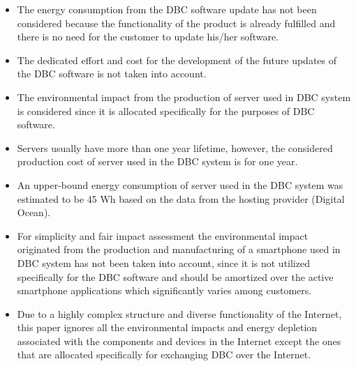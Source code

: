 \documentclass[conference]{IEEEtran}
\begin{document}
\begin{itemize}
\item The energy consumption from the DBC software update has not been considered because the functionality of the product is already fulfilled and there is no need for the customer to update his/her software.
\item The dedicated effort and cost for the development of the future updates of the DBC software is not taken into account.
\item The environmental impact from the production of server used in DBC system is considered since it is allocated specifically for the purposes of DBC software.
\item Servers usually have more than one year lifetime, however, the considered production cost of server used in the DBC system is for one year.
 \item An upper-bound energy consumption of server used in the DBC system was estimated to be 45 Wh based on the data from the hosting provider (Digital Ocean).
\item For simplicity and fair impact assessment the environmental impact originated from the production and manufacturing of a smartphone used in DBC system has not been taken into account, since it is not utilized specifically for the DBC software and should be amortized over the active smartphone applications which significantly varies among customers.
\item Due to a highly complex structure and diverse functionality of the Internet, this paper ignores all the environmental impacts and energy depletion associated with the components and devices in the Internet except the ones that are allocated specifically for exchanging DBC over the Internet.
\end{itemize}
\end{document}
